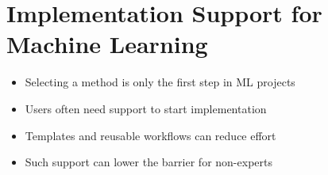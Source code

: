 \section{Implementation Support for Machine Learning}
\begin{itemize}
    \item Selecting a method is only the first step in ML projects
    \item Users often need support to start implementation
    \item Templates and reusable workflows can reduce effort
    \item Such support can lower the barrier for non-experts
\end{itemize}

